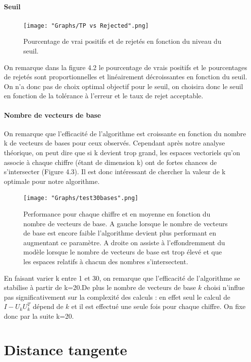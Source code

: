 \documentclass[a4paper,11pt,twoside]{report}
\begin{document}
\subsubsection{Seuil}

\begin{figure}[H]
  	\texttt{[image: "Graphs/TP vs Rejected".png]}
  	\caption{Pourcentage de vrai positifs et de rejetés en fonction du niveau du seuil.}
\end{figure}

On remarque dans la figure 4.2 le pourcentage de vrais positifs et le pourcentages de rejetés sont proportionnelles et linéairement décroissantes en fonction du seuil. On n'a donc pas de choix optimal objectif pour le seuil, on choisira donc le seuil en fonction de la tolérance à l'erreur et le taux de rejet acceptable. 

\subsubsection{Nombre de vecteurs de base}
On remarque que l'efficacité de l'algorithme est croissante en fonction du nombre k de vecteurs de bases pour ceux observés. Cependant après notre analyse théorique, on peut dire que si k devient trop grand, les espaces vectoriels qu'on associe à chaque chiffre (étant de dimension k) ont de fortes chances de s'intersecter (Figure 4.3). Il est donc intéressant de chercher la valeur de k optimale pour notre algorithme.

\begin{figure}[H]
  	\texttt{[image: "Graphs/test30bases".png]}
  	\caption{Performance pour chaque chiffre et en moyenne en fonction du nombre de vecteurs de base. A gauche lorsque le nombre de vecteurs de base est encore faible l'algorithme devient plus performant en augmentant ce paramètre. A droite on assiste à l'effondremment du modèle lorsque le nombre de vecteurs de base est trop élevé et que les espaces relatifs à chacun des nombres s'intersectent.}
\end{figure}

En faisant varier k entre 1 et 30, on remarque que l'efficacité de l'algorithme se stabilise à partir de k=20.De plus le nombre de vecteurs de base $k$ choisi n'influe pas significativement sur la complexité des calculs : en effet seul le calcul de $I-U_{k}U_{k}^{T}$ dépend de $k$ et il est effectué une seule fois pour chaque chiffre. On fixe donc par la suite k=20.

\chapter{Distance tangente}
\end{document}
